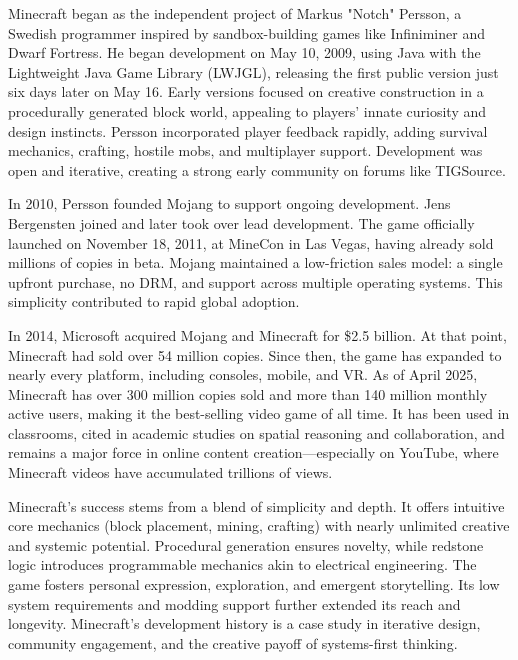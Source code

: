 \begin{historical}
Minecraft began as the independent project of Markus "Notch" Persson, a Swedish programmer inspired by sandbox-building games like Infiniminer and Dwarf Fortress. He began development on May 10, 2009, using Java with the Lightweight Java Game Library (LWJGL), releasing the first public version just six days later on May 16. Early versions focused on creative construction in a procedurally generated block world, appealing to players' innate curiosity and design instincts. Persson incorporated player feedback rapidly, adding survival mechanics, crafting, hostile mobs, and multiplayer support. Development was open and iterative, creating a strong early community on forums like TIGSource.

In 2010, Persson founded Mojang to support ongoing development. Jens Bergensten joined and later took over lead development. The game officially launched on November 18, 2011, at MineCon in Las Vegas, having already sold millions of copies in beta. Mojang maintained a low-friction sales model: a single upfront purchase, no DRM, and support across multiple operating systems. This simplicity contributed to rapid global adoption.

In 2014, Microsoft acquired Mojang and Minecraft for \$2.5 billion. At that point, Minecraft had sold over 54 million copies. Since then, the game has expanded to nearly every platform, including consoles, mobile, and VR. As of April 2025, Minecraft has over 300 million copies sold and more than 140 million monthly active users, making it the best-selling video game of all time. It has been used in classrooms, cited in academic studies on spatial reasoning and collaboration, and remains a major force in online content creation—especially on YouTube, where Minecraft videos have accumulated trillions of views.

Minecraft’s success stems from a blend of simplicity and depth. It offers intuitive core mechanics (block placement, mining, crafting) with nearly unlimited creative and systemic potential. Procedural generation ensures novelty, while redstone logic introduces programmable mechanics akin to electrical engineering. The game fosters personal expression, exploration, and emergent storytelling. Its low system requirements and modding support further extended its reach and longevity. Minecraft’s development history is a case study in iterative design, community engagement, and the creative payoff of systems-first thinking.
\end{historical}